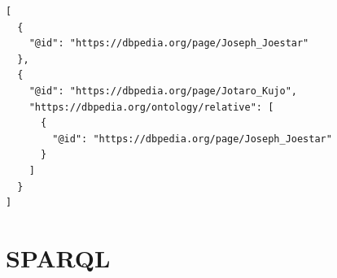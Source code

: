 \begin{verbatim}
[
  {
    "@id": "https://dbpedia.org/page/Joseph_Joestar"
  },
  {
    "@id": "https://dbpedia.org/page/Jotaro_Kujo",
    "https://dbpedia.org/ontology/relative": [
      {
        "@id": "https://dbpedia.org/page/Joseph_Joestar"
      }
    ]
  }
]
\end{verbatim}

\section{SPARQL}
\label{sec:sparql}




